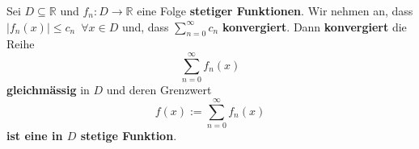 \documentclass[landscape, 10pt]{article}
\newcommand{\R}{\mathbb{R}}
\begin{document}
\begin{multicols}{3}
                     Sei \textcolor{NavyBlue}{$D\subseteq\R$} und 
                     \textcolor{NavyBlue}{
                     $f_n:D\longrightarrow\R$} 
                     eine Folge \textbf{stetiger Funktionen}. 
                     Wir nehmen an, dass \\
                     \textcolor{NavyBlue}{
                     $|f_n(x)|\leqslant c_n
                     \enspace\forall x\in D$}
                     und, dass 
                     \textcolor{NavyBlue}{
                     $\sum_{n=0}^\infty c_n$}
                     \textbf{konvergiert}. 
                     Dann \textbf{konvergiert} die Reihe 
                     \begin{equation*}
                            \sum_{n=0}^\infty f_n(x)
                     \end{equation*}
                     \textbf{gleichmässig} 
                     in $D$ und deren Grenzwert
                     \begin{equation*}
                            f(x):=\sum_{n=0}^\infty f_n(x)
                     \end{equation*}
                     \textbf{ist eine in $D$ stetige Funktion}.\\


\end{multicols}
\end{document}
